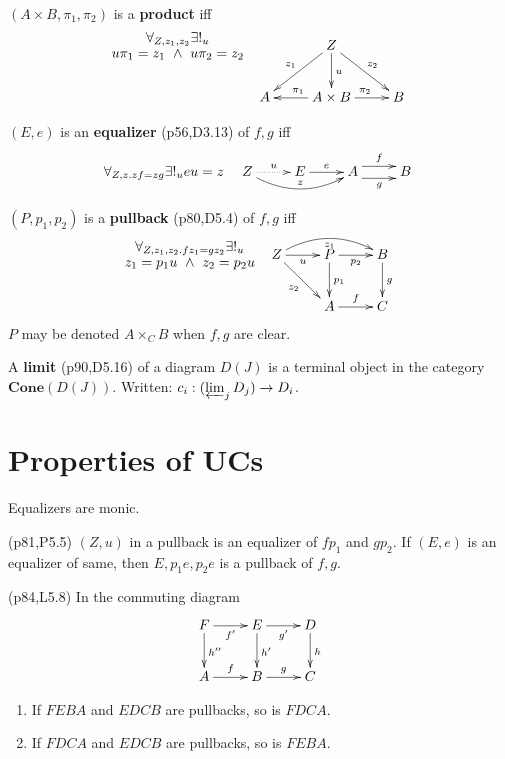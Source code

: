 \documentclass[10pt,twocolumn,letterpaper]{article}
\newcommand{\defn}[1]{{\bf #1}}
\begin{document}
  $(A \times B,\pi_1,\pi_2)$ is a \defn{product} iff
    \[\xymatrix{
    {}\save[]+<-1cm,0cm>*\txt<8pc>{$\forall_{Z,z_1,z_2} \exists!_u$\\$u\pi_1 = z_1 ~\wedge~ u\pi_2 = z_2$}\restore
    &      & Z \ar[dl]_{z_1} \ar[dr]^{z_2} \ar[d]^u & \\
    &    A & \ar[l]_{\pi_1} A \times B \ar[r]^{\pi_2} & B \\
    }\]

  $(E,e)$ is an \defn{equalizer} (p56,D3.13) of $f,g$ iff
     \[\forall_{Z,z . zf = zg} \exists!_u eu = z \quad
     \xymatrix{
     Z \ar@{..>}[r]^u \ar@/_1pc/[rr]^{z} & E \ar[r]^e & A \ar@<1ex>[r]^f \ar@<-1ex>[r]_g & B \\
     }\]

  $(P,p_1,p_2)$ is a \defn{pullback} (p80,D5.4) of $f,g$ iff
     \[\xymatrix{
     {}\save[]+<-1cm,0cm>*\txt<8pc>{$\forall_{Z,z_1,z_2 . fz_1 = gz_2}\exists!_u$\\$z_1 = p_1u ~\wedge~ z_2 = p_2u$}\restore
     & Z \ar[dr]_{z_2} \ar@/^1pc/[rr]_{z_1} \ar[r]_u & P \ar[d]^{p_1} \ar[r]_{p_2} & B \ar[d]^g \\
     &                                              & A \ar[r]^f & C
     }\]
     $P$ may be denoted $A \times_C B$ when $f,g$ are clear.

  A \defn{limit} (p90,D5.16) of a diagram $D(J)$ is a
  terminal object in the category $\mathbf{Cone}(D(J))$.  Written:
  $c_i : (\varprojlim_{j} D_j) \to D_i$.

\section{Properties of UCs}

  Equalizers are monic.

  (p81,P5.5) $(Z,u)$ in a pullback is an equalizer of $fp_1$ and $gp_2$.
    If $(E,e)$ is an equalizer of same, then $E,p_1e,p_2e$ is a pullback of $f,g$.

  (p84,L5.8) In the commuting diagram
    \[\xymatrix{ F \ar[r]_{f'} \ar[d]^{h''} & E \ar[r]_{g'} \ar[d]^{h'} & D \ar[d]^{h} \\
       A \ar[r]^f & B \ar[r]^g & C
    }\]
    \begin{enumerate}
      \item If $FEBA$ and $EDCB$ are pullbacks, so is $FDCA$.
      \item If $FDCA$ and $EDCB$ are pullbacks, so is $FEBA$.
    \end{enumerate}
\end{document}
